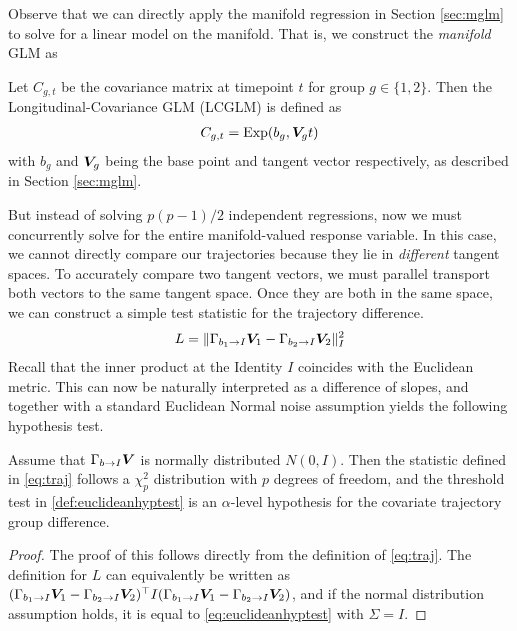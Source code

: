 Observe that we can directly apply the manifold regression in Section \ref{sec:mglm} to solve for a linear model on the manifold. 
That is, we construct the \textit{manifold} GLM as
\begin{definition} Let $C_{g,t}$ be the covariance matrix at timepoint $t$ for group $g \in \{1,2\}$. Then the 
	Longitudinal-Covariance GLM (LCGLM) is defined as
	\begin{align}\label{eq:LCGLM}
		C_{g,t} = \text{Exp}(b_g, \bm{V}_g t)
	\end{align}
	with $b_g$ and $\bm{V}_g$ being the base point and tangent vector respectively, as described in Section \ref{sec:mglm}.
\label{eq:lcglm}
\end{definition}
But instead of solving $p(p-1)/2$ independent regressions, now we must concurrently solve for the entire manifold-valued response variable.
In this case, we cannot directly compare our trajectories because they lie in {\em different} tangent spaces. To accurately compare two tangent vectors, 
we must parallel transport both vectors to the same tangent space. Once they are both in the same space, we can construct a simple test statistic for the trajectory difference.
\begin{align}
L = \|\Gamma_{b_1 \rightarrow I} \bm{V}_1 - \Gamma_{b_2 \rightarrow I} \bm{V}_2 \|_{I}^2
\label{eq:traj}
\end{align}
Recall that the inner product at the Identity $I$ coincides with the Euclidean metric. This can now be naturally interpreted as a difference of slopes, and together with a standard Euclidean Normal noise assumption yields the following hypothesis test.
\begin{proposition}\label{prop_prodstat}
Assume that $\Gamma_{b \rightarrow I} \bm{V}$ is normally distributed $N(0,I)$. Then the statistic defined in \eqref{eq:traj} follows a $\chi^2_{p}$ distribution with $p$ degrees of freedom, and the threshold test in \ref{def:euclideanhyptest} is an $\alpha$-level hypothesis for the covariate trajectory group difference.
\end{proposition}
\begin{proof}
	The proof of this follows directly from the definition of \eqref{eq:traj}. The definition for $L$ can equivalently be written as $(\Gamma_{b_1 \rightarrow I} \bm{V}_1 - \Gamma_{b_2 \rightarrow I} \bm{V}_2 )^\top I (\Gamma_{b_1 \rightarrow I} \bm{V}_1 - \Gamma_{b_2 \rightarrow I} \bm{V}_2)$, and if the normal distribution assumption holds, it is equal to \eqref{eq:euclideanhyptest} with $\Sigma = I$.
\end{proof}
